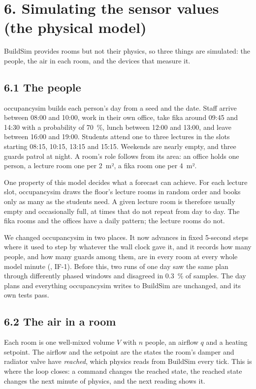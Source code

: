 \section{6. Simulating the sensor values (the physical model)}

BuildSim provides rooms but not their physics, so three things are simulated:
the people, the air in each room, and the devices that measure it.

\subsection{6.1 The people}

occupancysim builds each person's day from a seed and the date. Staff arrive
between 08:00 and 10:00, work in their own office, take fika around 09:45 and
14:30 with a probability of 70~\%, lunch between 12:00 and 13:00, and leave
between 16:00 and 19:00. Students attend one to three lectures in the slots
starting 08:15, 10:15, 13:15 and 15:15. Weekends are nearly empty, and three
guards patrol at night. A room's role follows from its area: an office holds
one person, a lecture room one per 2~m², a fika room one per 4~m².

One property of this model decides what a forecast can achieve. For each
lecture slot, occupancysim draws the floor's lecture rooms in random order and
books only as many as the students need. A given lecture room is therefore
usually empty and occasionally full, at times that do not repeat from day to
day. The fika rooms and the offices have a daily pattern; the lecture rooms do
not.

We changed occupancysim in two places. It now advances in fixed 5-second steps
where it used to step by whatever the wall clock gave it, and it records how
many people, and how many guards among them, are in every room at every whole
model minute (, IF-1). Before this, two runs of one day
saw the same plan through differently phased windows and disagreed in 0.3~\%
of samples. The day plans and everything occupancysim writes to BuildSim are
unchanged, and its own tests pass.

\subsection{6.2 The air in a room}

Each room is one well-mixed volume $V$ with $n$ people, an airflow $q$ and a
heating setpoint. The airflow and the setpoint are the states the room's damper
and radiator valve have \emph{reached}, which physics reads from BuildSim every
tick. This is where the loop closes: a command changes the reached state, the
reached state changes the next minute of physics, and the next reading shows
it.

